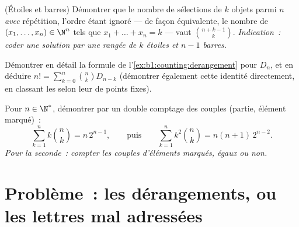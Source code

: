 \begin{exercise}[$\star\star$]\label{exo:b1:counting:10}
(Étoiles et barres) Démontrer que le nombre de sélections de $k$ objets
parmi $n$ \emph{avec} répétition, l'ordre étant ignoré --- de façon
équivalente, le nombre de $(x_1, \dots, x_n) \in \N^n$ tels que
$x_1 + \dots + x_n = k$ --- vaut $\binom{n + k - 1}{k}$.
\emph{Indication~: coder une solution par une rangée de $k$ étoiles et
$n - 1$ barres.}
\end{exercise}

\begin{exercise}[$\star\star\star$]\label{exo:b1:counting:11}
Démontrer en détail la formule de l'\cref{ex:b1:counting:derangement} pour
$D_n$, et en déduire $n! = \sum_{k=0}^{n} \binom{n}{k} D_{n-k}$
(démontrer également cette identité directement, en classant les
 selon leur  de points fixes).
\end{exercise}

\begin{exercise}[$\star\star\star$]\label{exo:b1:counting:12}
Pour $n \in \N^*$, démontrer par un double comptage des couples (partie,
élément marqué)~:
\[
\sum_{k=1}^{n} k \binom{n}{k} = n\, 2^{n-1},
\qquad\text{puis}\qquad
\sum_{k=1}^{n} k^2 \binom{n}{k} = n(n+1)\, 2^{n-2} .
\]
\emph{Pour la seconde~: compter les couples d'éléments marqués, égaux ou non.}
\end{exercise}

\section{Problème~: les dérangements, ou les lettres mal adressées}


